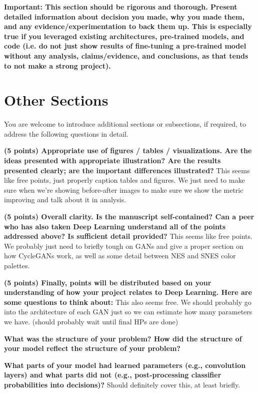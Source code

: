 \documentclass[10pt,twocolumn,letterpaper]{article}
\begin{document}
\textbf{Important: This section should be rigorous and thorough. Present detailed information about decision you made, why you made them, and any evidence/experimentation to back them up. This is especially true if you leveraged existing architectures, pre-trained models, and code (i.e. do not just show results of fine-tuning a pre-trained model without any analysis, claims/evidence, and conclusions, as that tends to not make a strong project). }

\section{Other Sections}

You are welcome to introduce additional sections or subsections, if required, to address the following questions in detail.

\textbf{(5 points) Appropriate use of figures / tables / visualizations. Are the ideas presented with appropriate illustration? Are the results presented clearly; are the important differences illustrated?}
This seems like free points, just properly caption tables and figures. We just need to make sure when we're showing before-after images to make sure we show the metric improving and talk about it in analysis.

\textbf{(5 points) Overall clarity. Is the manuscript self-contained? Can a peer who has also taken Deep Learning understand all of the points addressed above? Is sufficient detail provided?}
This seems like free points. We probably just need to briefly tough on GANs and give a proper section on how CycleGANs work, as well as some detail between NES and SNES color palettes.

\textbf{(5 points) Finally, points will be distributed based on your understanding of how your project relates to Deep Learning. Here are some questions to think about:}
This also seems free. We should probably go into the architecture of each GAN just so we can estimate how many parameters we have. (should probably wait until final HPs are done)

\textbf{What was the structure of your problem? How did the structure of your model reflect the structure of your problem?}

\textbf{What parts of your model had learned parameters (e.g., convolution layers) and what parts did not (e.g., post-processing classifier probabilities into decisions)?}
Should definitely cover this, at least briefly.
\end{document}
